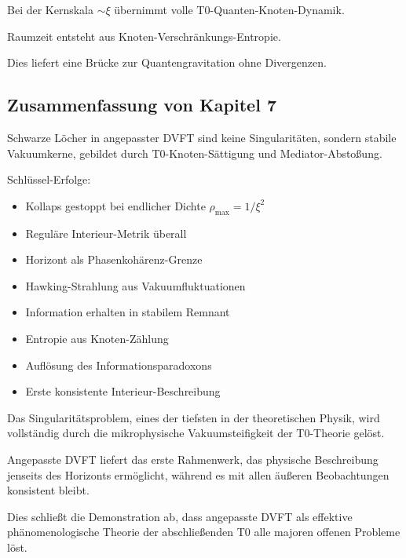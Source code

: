 	Bei der Kernskala $\sim \xi$ übernimmt volle T0-Quanten-Knoten-Dynamik.
	
	Raumzeit entsteht aus Knoten-Verschränkungs-Entropie.
	
	Dies liefert eine Brücke zur Quantengravitation ohne Divergenzen.
	
	\subsection{Zusammenfassung von Kapitel 7}
	
	Schwarze Löcher in angepasster DVFT sind keine Singularitäten, sondern stabile Vakuumkerne, gebildet durch T0-Knoten-Sättigung und Mediator-Abstoßung.
	
	Schlüssel-Erfolge:
	\begin{itemize}
		\item Kollaps gestoppt bei endlicher Dichte $\rho_{\text{max}} = 1/\xi^2$
		\item Reguläre Interieur-Metrik überall
		\item Horizont als Phasenkohärenz-Grenze
		\item Hawking-Strahlung aus Vakuumfluktuationen
		\item Information erhalten in stabilem Remnant
		\item Entropie aus Knoten-Zählung
		\item Auflösung des Informationsparadoxons
		\item Erste konsistente Interieur-Beschreibung
	\end{itemize}
	
	Das Singularitätsproblem, eines der tiefsten in der theoretischen Physik, wird vollständig durch die mikrophysische Vakuumsteifigkeit der T0-Theorie gelöst.
	
	Angepasste DVFT liefert das erste Rahmenwerk, das physische Beschreibung jenseits des Horizonts ermöglicht, während es mit allen äußeren Beobachtungen konsistent bleibt.
	
	Dies schließt die Demonstration ab, dass angepasste DVFT als effektive phänomenologische Theorie der abschließenden T0 alle majoren offenen Probleme löst.
	
